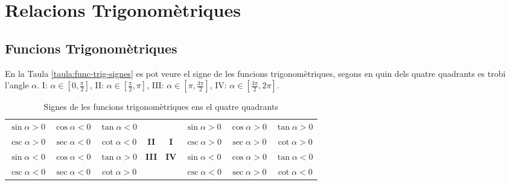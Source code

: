 \chapter{Relacions Trigonom\`{e}triques}

\section{Funcions Trigonom\`{e}triques}

En la Taula \vref{taula:func-trig-signes} es pot veure el signe de
les funcions trigonom\`{e}triques, segons en quin dels quatre quadrants
es trobi l'angle $\alpha$. I: $\alpha\in[0,\frac{\pi}{2}]$, II:
$\alpha\in[\frac{\pi}{2},\pi]$, III:
$\alpha\in[\pi,\frac{3\pi}{2}]$, IV:
$\alpha\in[\frac{3\pi}{2},2\pi]$.

\begin{table}[h]
   \caption{\label{taula:func-trig-signes} Signes de les funcions trigonom\`{e}triques ens el quatre quadrants}
   \begin{center}\begin{tabular}{cccc|cccc}
   $\sin\alpha > 0$ & $\cos\alpha < 0$ & $\tan\alpha < 0$ & & &
   $\sin\alpha > 0$ & $\cos\alpha > 0$ & $\tan\alpha > 0$ \\
   $\csc\alpha > 0$ & $\sec\alpha < 0$ & $\cot\alpha < 0$ & \textbf{II}&
   \textbf{I} & $\csc\alpha > 0$ & $\sec\alpha > 0$ & $\cot\alpha > 0$ \\
   \hline
   $\sin\alpha < 0$ & $\cos\alpha < 0$ & $\tan\alpha > 0$
   &\textbf{III} &
   \textbf{IV} & $\sin\alpha < 0$ & $\cos\alpha > 0$ & $\tan\alpha < 0$ \\
   $\csc\alpha < 0$ & $\sec\alpha < 0$ & $\cot\alpha > 0$  & & &
   $\csc\alpha < 0$ & $\sec\alpha > 0$ & $\cot\alpha < 0$
   \end{tabular} \end{center}
\end{table}


